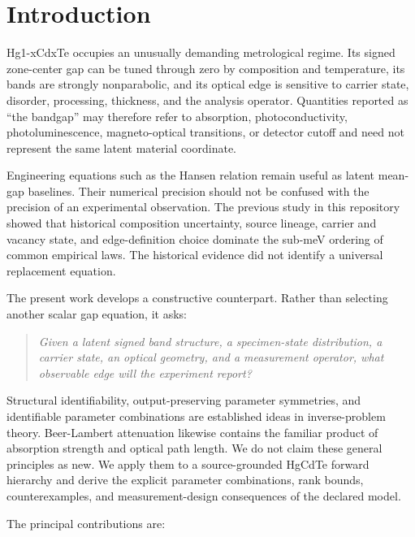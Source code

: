 \documentclass[12pt]{article}
\begin{document}
\section{Introduction}

Hg1-xCdxTe occupies an unusually demanding metrological regime. Its signed zone-center gap can be tuned through zero by composition and temperature, its bands are strongly nonparabolic, and its optical edge is sensitive to carrier state, disorder, processing, thickness, and the analysis operator. Quantities reported as ``the bandgap'' may therefore refer to absorption, photoconductivity, photoluminescence, magneto-optical transitions, or detector cutoff and need not represent the same latent material coordinate.

Engineering equations such as the Hansen relation remain useful as latent mean-gap baselines. Their numerical precision should not be confused with the precision of an experimental observation. The previous study in this repository showed that historical composition uncertainty, source lineage, carrier and vacancy state, and edge-definition choice dominate the sub-meV ordering of common empirical laws. The historical evidence did not identify a universal replacement equation.

The present work develops a constructive counterpart. Rather than selecting another scalar gap equation, it asks:

\begin{quote}\itshape
Given a latent signed band structure, a specimen-state distribution, a carrier state, an optical geometry, and a measurement operator, what observable edge will the experiment report?
\end{quote}

Structural identifiability, output-preserving parameter symmetries, and identifiable parameter combinations are established ideas in inverse-problem theory. \cite{bellman_astrom_1970,yates_evans_chappell_2009,eisenberg_hayashi_2014} Beer-Lambert attenuation likewise contains the familiar product of absorption strength and optical path length. We do not claim these general principles as new. We apply them to a source-grounded HgCdTe forward hierarchy and derive the explicit parameter combinations, rank bounds, counterexamples, and measurement-design consequences of the declared model.

The principal contributions are:
\end{document}
